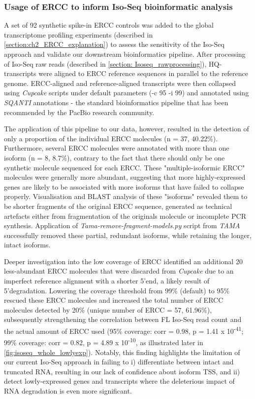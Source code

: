 \newpage
\subsubsection{Usage of ERCC to inform Iso-Seq bioinformatic analysis}
A set of 92 synthetic spike-in ERCC controls was added to the global transcriptome profiling experiments (described in \cref{section:ch2_ERCC_explanation}) to assess the sensitivity of the Iso-Seq approach and validate our downstream bioinformatics pipeline. After processing of Iso-Seq raw reads (described in \cref{section: Isoseq_rawprocessing}), HQ-transcripts were aligned to ERCC reference sequences in parallel to the reference genome. ERCC-aligned and reference-aligned transcripts were then collapsed using \textit{Cupcake} scripts under default parameters (-c 95 -i 99) and annotated using \textit{SQANTI} annotations - the standard bioinformatics pipeline that has been recommended by the PacBio research community. 

The application of this pipeline to our data, however, resulted in the detection of only a proportion of the individual ERCC molecules (n = 37, 40.22\%). Furthermore, several ERCC molecules were annotated with more than one isoform (n = 8, 8.7\%), contrary to the fact that there should only be one synthetic molecule sequenced for each ERCC. These "multiple-isoformic ERCC" molecules were generally more abundant, suggesting that more highly-expressed genes are likely to be associated with more isoforms that have failed to collapse properly. Visualisation and BLAST analysis of these "isoforms" revealed them to be shorter fragments of the original ERCC sequence, generated as technical artefacts either from fragmentation of the originals molecule or incomplete PCR synthesis. Application of \textit{Tama-remove-fragment-models.py} script from \textit{TAMA}\cite{Kuo2017} successfully removed these partial, redundant isoforms, while retaining the longer, intact isoforms. 

Deeper investigation into the low coverage of ERCC identified an additional 20 less-abundant ERCC molecules that were 
discarded from \textit{Cupcake} due to an imperfect reference alignment with a shorter 5'end, a likely result of 5'degradation. Lowering the coverage threshold from 99\% (default) to 95\% rescued these ERCC molecules and increased the total number of ERCC molecules detected by 20\% (unique number of ERCC = 57, 61.96\%), subsequently strengthening the correlation between FL Iso-Seq read count and the actual amount of ERCC used (95\% coverage: corr = 0.98, p = 1.41 x 10\textsuperscript{-41}; 99\% coverage: corr = 0.82, p = 4.89 x 10\textsuperscript{-10}, as illustrated later in \cref{fig:isoseq_whole_lowlyexp}). Notably, this finding highlights the limitation of our current Iso-Seq approach in failing to i) differentiate between intact and truncated RNA, resulting in our lack of confidence about isoform TSS, and ii) detect lowly-expressed genes and transcripts where the deleterious impact of RNA degradation is even more significant. 
